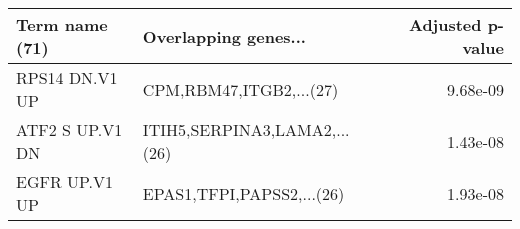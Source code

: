 \begin{tabular}{llr}
\toprule
 Term name (71) &         Overlapping genes... &  Adjusted p-value \\
\midrule
 RPS14 DN.V1 UP &      CPM,RBM47,ITGB2,...(27) &          9.68e-09 \\
ATF2 S UP.V1 DN & ITIH5,SERPINA3,LAMA2,...(26) &          1.43e-08 \\
  EGFR UP.V1 UP &    EPAS1,TFPI,PAPSS2,...(26) &          1.93e-08 \\
\bottomrule
\end{tabular}
